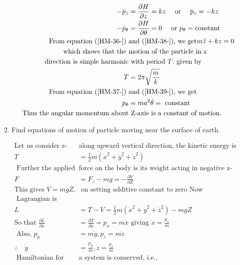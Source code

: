 \begin{enumerate}
\begin{answer}
\begin{align}
-\dot{p}_{z}&=\frac{\partial H}{\partial z}=k z \quad\text{ or }\quad \dot{\mathrm{p}}_{z}=-k z\label{HM-38-}\\
-\dot{p}_{\theta}&=\frac{\partial H}{\partial \theta}=0 \quad\text{ or }
p_{\theta}= \text{constant}\label{HM-39-}\\
\text{From equation (\ref{HM-36-}) }&\text{and (\ref{HM-38-}), we get}
m \ddot{z}+k z=0\notag\\
\text{which shows that the }&\text{motion of the particle in z}\\
\text{ direction is simple harmonic}&\text{ with period $T$, given by}\notag\\
T&=2 \pi \sqrt{\frac{m}{k}}\notag\\
\text{From equation (\ref{HM-37-}) }&\text{and (\ref{HM-39-}), we get}\notag\\
p_{\theta}&=m a^{2} \dot{\theta}=\text { constant }\notag\\
\text{Thus the angular momentum about}&\text{ Z-axis is a constant of motion.}\notag
	\end{align}
\end{answer}
	\item Find equations of motion of particle moving near the surface of earth.
	\begin{answer}
		\begin{align*}
		\text{Let us consider z-axis }&\text{along upward vertical direction, the kinetic energy is}\\
		T&=\frac{1}{2} m\left(\dot{x}^{2}+\dot{y}^{2}+\dot{z}^{2}\right)\\
	\text{	Further the applied }&\text{force on the body is its weight acting in negative z-direction, i.e.,}\\
		F&=F_{z}-m g=-\frac{\partial V}{\partial Z}\\
		\text{This gives $V=m g Z$,}&\text{ on setting additive constant to zero Now} \\
	\text{	Lagrangian is}\\
		L&=T-V=\frac{1}{2} m\left(\dot{x}^{2}+\dot{y}^{2}+\dot{z}^{2}\right)-m g Z\\
		\text{So that }\frac{\partial L}{\partial \dot{x}}&=\frac{\partial T}{\partial \dot{x}}=p_{x}=m \dot{x}\text{ giving }\dot{x}=\frac{p_{x}}{m}\\
	\text{	Also, }p_{y}&=m \dot{y}, p_{z}=m \dot{z}\\
		\therefore \quad \dot{y}&=\frac{p_{y}}{m}, \dot{z}=\frac{p_{z}}{m}\\
	\text{	Hamiltonian for such }&\text{a system is conserved, i.e.,}\\

\end{align*}
\end{answer}
\end{enumerate}

